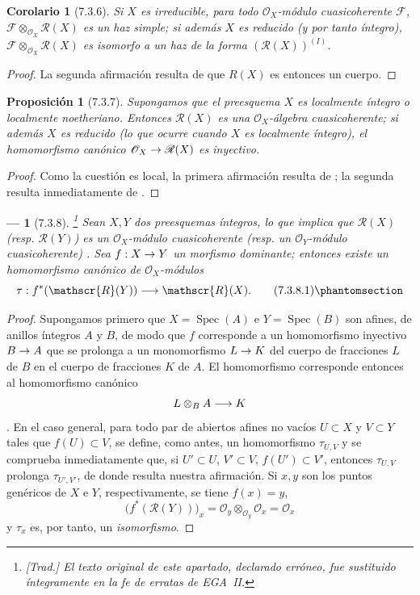 \documentclass[oneside]{amsart}
\theoremstyle{ega-env-style}
\newtheorem*{env}{---}
\theoremstyle{ega-thm-env-style}
\newtheorem*{proposition}{Proposición}
\newtheorem*{corollary}{Corolario}
\theoremstyle{ega-defn-env-style}
\renewcommand{\to}{\mathchoice{\longrightarrow}{\rightarrow}{\rightarrow}{\rightarrow}}
\newcommand{\oldpage}[2][]{{\marginnote{\normalfont{\textbf{#1}~|~#2}}}\ignorespaces}
\let\EGAOriginalLabel\label
\renewcommand{\label}[1]{\phantomsection\EGAOriginalLabel{#1}}
\begin{document}
\begin{corollary}[7.3.6]
\label{I.7.3.6}
Si $X$ es irreducible, para todo $\mathscr{O}_X$-módulo cuasicoherente $\mathscr{F}$, $\mathscr{F}\otimes_{\mathscr{O}_X}\mathscr{R}(X)$ es un haz simple; si además $X$ es reducido (y por tanto íntegro), $\mathscr{F}\otimes_{\mathscr{O}_X}\mathscr{R}(X)$ es isomorfo a un haz de la forma $(\mathscr{R}(X))^{(I)}$.
\end{corollary}

\begin{proof}
La segunda afirmación resulta de que $R(X)$ es entonces un cuerpo.
\end{proof}

\begin{proposition}[7.3.7]
\label{I.7.3.7}
Supongamos que el preesquema $X$ es localmente íntegro o localmente
\oldpage[I]{163}
noetheriano.
Entonces $\mathscr{R}(X)$ es una $\mathscr{O}_X$-álgebra cuasicoherente; si además $X$ es reducido (lo que ocurre cuando $X$ es localmente íntegro), el homomorfismo canónico $\mathscr{O}_X\to\mathscr{R}(X)$ es inyectivo.
\end{proposition}

\begin{proof}
Como la cuestión es local, la primera afirmación resulta de ; la segunda resulta inmediatamente de .
\end{proof}

\begin{env}[7.3.8]
\label{I.7.3.8}
\footnote{\emph{[Trad.] El texto original de este apartado, declarado erróneo, fue sustituido íntegramente en la fe de erratas de EGA~II.}}
Sean $X,Y$ dos preesquemas \emph{íntegros}, lo que implica que $\mathscr{R}(X)$ (resp. $\mathscr{R}(Y)$) es un $\mathscr{O}_X$-módulo cuasicoherente (resp. un $\mathscr{O}_Y$-módulo cuasicoherente) .
Sea $f:X\to Y$ un morfismo \emph{dominante}; entonces existe un homomorfismo canónico de $\mathscr{O}_X$-módulos
\[
  \tau:f^*(\mathscr{R}(Y))\to\mathscr{R}(X).
\tag{7.3.8.1}
\label{I.7.3.8.1-fr}
\]
\end{env}

\begin{proof}
Supongamos primero que $X=\operatorname{Spec}(A)$ e $Y=\operatorname{Spec}(B)$ son afines, de anillos íntegros $A$ y $B$, de modo que $f$ corresponde a un homomorfismo inyectivo $B\to A$ que se prolonga a un monomorfismo $L\to K$ del cuerpo de fracciones $L$ de $B$ en el cuerpo de fracciones $K$ de $A$.
El homomorfismo  corresponde entonces al homomorfismo canónico \[
  L\otimes_B A\to K
\] .
En el caso general, para todo par de abiertos afines no vacíos $U\subset X$ y $V\subset Y$ tales que $f(U)\subset V$, se define, como antes, un homomorfismo $\tau_{U,V}$ y se comprueba inmediatamente que, si $U'\subset U$, $V'\subset V$, $f(U')\subset V'$, entonces $\tau_{U,V}$ prolonga $\tau_{U',V'}$, de donde resulta nuestra afirmación.
Si $x,y$ son los puntos genéricos de $X$ e $Y$, respectivamente, se tiene $f(x)=y$,
\[
  \bigl(f^*(\mathscr{R}(Y))\bigr)_x
  =\mathscr{O}_y\otimes_{\mathscr{O}_y}\mathscr{O}_x
  =\mathscr{O}_x
\]
 y $\tau_x$ es, por tanto, un \emph{isomorfismo}.
\end{proof}
\end{document}
